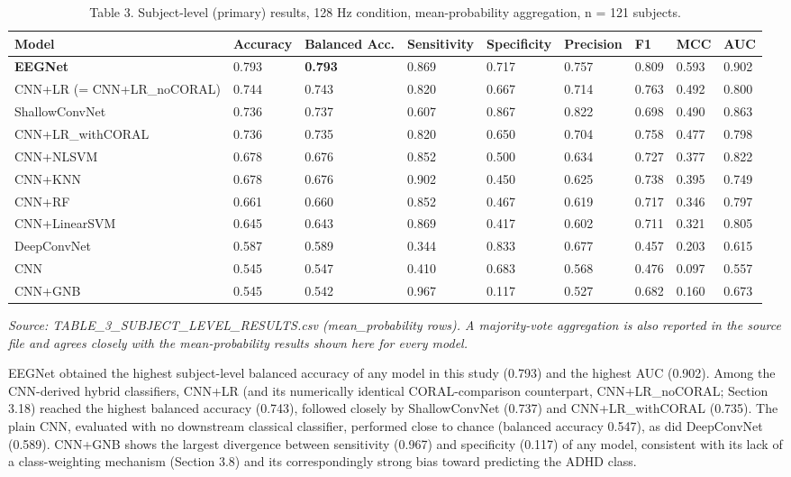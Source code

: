 \documentclass[a4paper,fleqn]{cas-sc}
\begin{document}
\begin{table}[htbp]
\centering
\small
\caption{Table 3. Subject-level (primary) results, 128 Hz condition, mean-probability aggregation, n = 121 subjects.}
\begin{tabular}{lllllllll}
\toprule
Model & Accuracy & Balanced Acc. & Sensitivity & Specificity & Precision & F1 & MCC & AUC \\
\midrule
\textbf{EEGNet} & 0.793 & \textbf{0.793} & 0.869 & 0.717 & 0.757 & 0.809 & 0.593 & 0.902 \\
CNN+LR (= CNN+LR\_noCORAL) & 0.744 & 0.743 & 0.820 & 0.667 & 0.714 & 0.763 & 0.492 & 0.800 \\
ShallowConvNet & 0.736 & 0.737 & 0.607 & 0.867 & 0.822 & 0.698 & 0.490 & 0.863 \\
CNN+LR\_withCORAL & 0.736 & 0.735 & 0.820 & 0.650 & 0.704 & 0.758 & 0.477 & 0.798 \\
CNN+NLSVM & 0.678 & 0.676 & 0.852 & 0.500 & 0.634 & 0.727 & 0.377 & 0.822 \\
CNN+KNN & 0.678 & 0.676 & 0.902 & 0.450 & 0.625 & 0.738 & 0.395 & 0.749 \\
CNN+RF & 0.661 & 0.660 & 0.852 & 0.467 & 0.619 & 0.717 & 0.346 & 0.797 \\
CNN+LinearSVM & 0.645 & 0.643 & 0.869 & 0.417 & 0.602 & 0.711 & 0.321 & 0.805 \\
DeepConvNet & 0.587 & 0.589 & 0.344 & 0.833 & 0.677 & 0.457 & 0.203 & 0.615 \\
CNN & 0.545 & 0.547 & 0.410 & 0.683 & 0.568 & 0.476 & 0.097 & 0.557 \\
CNN+GNB & 0.545 & 0.542 & 0.967 & 0.117 & 0.527 & 0.682 & 0.160 & 0.673 \\
\bottomrule
\end{tabular}
\end{table}

\textit{Source: TABLE\_3\_SUBJECT\_LEVEL\_RESULTS.csv (mean\_probability rows). A majority-vote aggregation is also reported in the source file and agrees closely with the mean-probability results shown here for every model.}



EEGNet obtained the highest subject-level balanced accuracy of any model in this study (0.793) and the highest AUC (0.902). Among the CNN-derived hybrid classifiers, CNN+LR (and its numerically identical CORAL-comparison counterpart, CNN+LR\_noCORAL; Section 3.18) reached the highest balanced accuracy (0.743), followed closely by ShallowConvNet (0.737) and CNN+LR\_withCORAL (0.735). The plain CNN, evaluated with no downstream classical classifier, performed close to chance (balanced accuracy 0.547), as did DeepConvNet (0.589). CNN+GNB shows the largest divergence between sensitivity (0.967) and specificity (0.117) of any model, consistent with its lack of a class-weighting mechanism (Section 3.8) and its correspondingly strong bias toward predicting the ADHD class.
\end{document}
